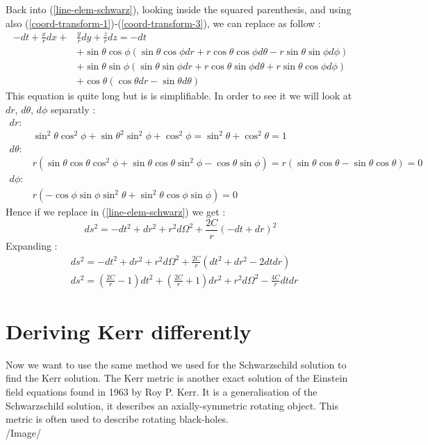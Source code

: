 \documentclass[a4paper,12pt]{article}
\theoremstyle{definition}
\begin{document}
Back into (\ref{line-elem-schwarz}), looking inside the squared parenthesis, and using also (\ref{coord-transform-1})-(\ref{coord-transform-3}), we can replace as follow :
\begin{align*}
	-dt+\frac{x}{r}dx+&\frac{y}{r}dy+\frac{z}{r}dz =-dt\\
	&+\sin{\theta} \cos{\phi} (\sin{\theta} \cos{\phi} dr+r\cos{\theta} \cos{\phi} d\theta -r\sin{\theta} \sin{\phi} d\phi )\\
	&+\sin{\theta} \sin{\phi} (\sin{\theta} \sin{\phi} dr+r\cos{\theta} \sin{\phi} d\theta +r\sin{\theta} \cos{\phi} d\phi )\\
	&+\cos{\theta} (\cos{\theta} dr-\sin{\theta} d\theta )
\end{align*}
This equation is quite long but is is simplifiable. In order to see it  we will look at $dr$, $d\theta$, $d\phi$ separatly :
\begin{align*}
	dr :& \\
	&\sin^2{\theta}\cos^2{\phi}+\sin{\theta}^2\sin^2{\phi}+\cos^2{\phi}=\sin^2{\theta}+\cos^2{\theta}=1\\
	d\theta :& \\
	&r(\sin{\theta}\cos{\theta}\cos^2{\phi}+\sin{\theta}\cos{\theta}\sin^2{\phi}-\cos{\theta}\sin{\phi})=r(\sin{\theta}\cos{\theta}-\sin{\theta}\cos{\theta})=0\\
	d\phi :& \\
	&r(-\cos{\phi}\sin{\phi}\sin^2{\theta}+\sin^2{\theta}\cos{\phi}\sin{\phi})=0
\end{align*}
Hence if we replace in (\ref{line-elem-schwarz}) we get :
\begin{equation*}
	ds^2=-dt^2+dr^2+r^2d\Omega^2+\frac{2C}{r}(-dt+dr)^2
\end{equation*}
Expanding :
\begin{align*}
	&ds^2=-dt^2+dr^2+r^2d\Omega^2+\frac{2C}{r}(dt^2+dr^2-2dtdr)\\
	&ds^2=(\frac{2C}{r}-1)dt^2+(\frac{2C}{r}+1)dr^2+r^2d\Omega^2-\frac{4C}{r}dtdr
\end{align*}

\section{Deriving Kerr differently}
Now we want to use the same method we used for the Schwarzschild solution to find the Kerr solution.
The Kerr metric is another exact solution of the Einstein field equations found in 1963 by Roy P. Kerr.
It is a generalisation of the Schwarzschild solution, it describes an axially-symmetric rotating object.
This metric is often used to describe rotating black-holes.\\
/Image/
\end{document}
